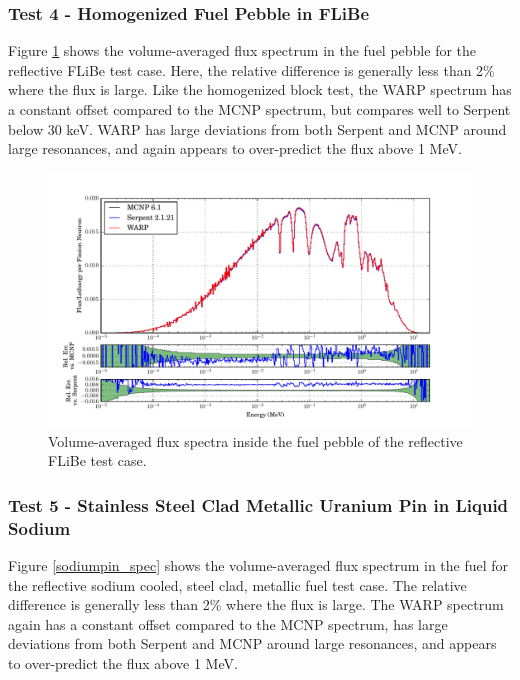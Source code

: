 \documentclass[preprint,12pt]{elsarticle}
\begin{document}
\newpage
\subsubsection{Test 4 - Homogenized Fuel Pebble in FLiBe}

Figure \ref{flibe_spec} shows the volume-averaged flux spectrum in the fuel pebble for the reflective FLiBe test case.  Here, the relative difference is generally less than 2\% where the flux is large.  Like the homogenized block test, the WARP spectrum has a constant offset compared to the MCNP spectrum, but compares well to Serpent below 30 keV. WARP has large deviations from both Serpent and MCNP around large resonances, and again appears to over-predict the flux above 1 MeV.


\begin{figure}[h!]
\centering
\includegraphics[width=\textwidth,trim= 1cm 0cm 1cm 0cm]{graphics/flibe_spec.pdf}
\caption{Volume-averaged flux spectra inside the fuel pebble of the reflective FLiBe test case. \label{flibe_spec} }
\end{figure}

\newpage
\subsubsection{Test 5 - Stainless Steel Clad Metallic Uranium Pin in Liquid Sodium}

Figure \ref{sodiumpin_spec} shows the volume-averaged flux spectrum in the fuel for the reflective sodium cooled, steel clad, metallic fuel test case.  The relative difference is generally less than 2\% where the flux is large.  The WARP spectrum again has a constant offset compared to the MCNP spectrum, has large deviations from both Serpent and MCNP around large resonances, and appears to over-predict the flux above 1 MeV.
\end{document}
